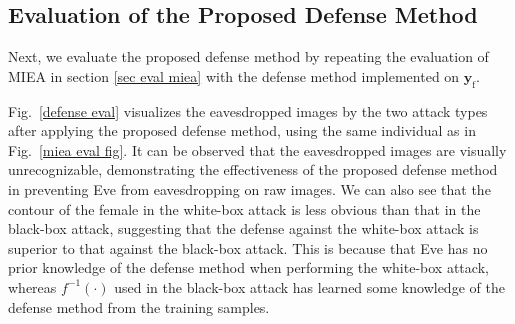\documentclass[conference]{IEEEtran}
\begin{document}




\subsection{Evaluation of the Proposed Defense Method}
\label{sec eval of defense}
Next, we evaluate the proposed defense method by repeating the evaluation of MIEA in section \ref{sec eval miea} with the defense method implemented on $\boldsymbol{y}_\mathrm{f}$. 


Fig.~\ref{defense eval} visualizes the eavesdropped images by the two attack types after applying the proposed defense method, using the same individual as in Fig.~\ref{miea eval fig}. It can be observed that the eavesdropped images are visually unrecognizable, demonstrating the effectiveness of the proposed defense method in preventing Eve from eavesdropping on raw images. We can also see that the contour of the female in the white-box attack is less obvious than that in the black-box attack, suggesting that the defense against the white-box attack is superior to that against the black-box attack. This is because that Eve has no prior knowledge of the defense method when performing the white-box attack, whereas $f^{-1}(\cdot)$ used in the black-box attack has learned some knowledge of the defense method from the training samples. 

\end{document}
